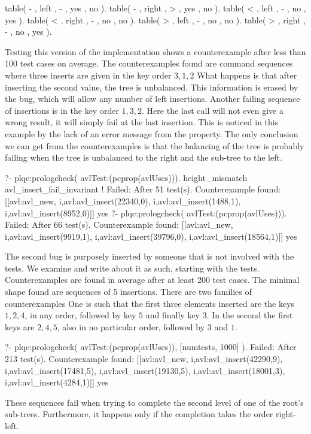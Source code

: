 \documentclass[11pt]{article}
\begin{document}
\begin{yapcode}
 table( -  , left   , -  , yes  , no   ).
 table( -  , right  , >  , yes  , no   ).
 table( <  , left   , -  , no   , yes  ).
 table( <  , right  , -  , no   , no   ).
 table( >  , left   , -  , no   , no   ).
 table( >  , right  , -  , no   , yes  ).
\end{yapcode}
%
%
Testing this version of the implementation shows a counterexample after
less than 100 test cases on average.
%
%
The counterexamples found are command sequences where three inserts are
given in the key order $3, 1, 2$
%
What happens is that after inserting the second value, the tree is
unbalanced.
%
This information is erased by the bug, which will allow any number of
left insertions.
%
Another failing sequence of insertions is in the key order $1, 3, 2$.
%
Here the last call will not even give a wrong result, it will simply
fail at the last insertion.
%
This is noticed in this example by the lack of an error message from the
property.
%
%
The only conclusion we can get from the counterexamples is that the
balancing of the tree is probably failing when the tree is unbalanced to
the right and the sub-tree to the left.
\begin{yapcode}
   ?- plqc:prologcheck(
             avlTest:(pcprop(avlUses))).
 height_mismatch
 avl_insert_fail_invariant
 !
 Failed: After 51 test(s).
 Counterexample found:
   [[avl:avl_new,
     {i,avl:avl_insert(22340,0)},
     {i,avl:avl_insert(1488,1)},
     {i,avl:avl_insert(8952,0)}]] 
 yes
   ?- plqc:prologcheck(
             avlTest:(pcprop(avlUses))).
 Failed: After 66 test(s).
 Counterexample found:
   [[avl:avl_new,
     {i,avl:avl_insert(9919,1)},
     {i,avl:avl_insert(39796,0)},
     {i,avl:avl_insert(18564,1)}]]
 yes
\end{yapcode}



The second bug is purposely inserted by someone that is not involved
with the tests.
%
We examine and write about it as such, starting with the tests.
%
Counterexamples are found in average after at least 200 test cases.
%
The minimal shape found are sequences of 5 insertions.
%
There are two families of counterexamples
%
One is such that the first three elements inserted are the keys $1, 2,
4$, in any order, followed by key $5$ and finally key $3$.
%
In the second the first keys are $2, 4, 5$, also in no particular order,
followed by $3$ and $1$.
%
\begin{yapcode}
   ?- plqc:prologcheck(
               avlTest:(pcprop(avlUses)),
               [{numtests, 1000}] ).
 Failed: After 213 test(s).
 Counterexample found:
   [[avl:avl_new,
     {i,avl:avl_insert(42290,9)},
     {i,avl:avl_insert(17481,5)},
     {i,avl:avl_insert(19130,5)},
     {i,avl:avl_insert(18001,3)},
     {i,avl:avl_insert(4284,1)}]]
 yes
\end{yapcode}
%
These sequences fail when trying to complete the second level of one of
the root's sub-trees.
%
Furthermore, it happens only if the completion takes the order
right-left.
\end{document}
